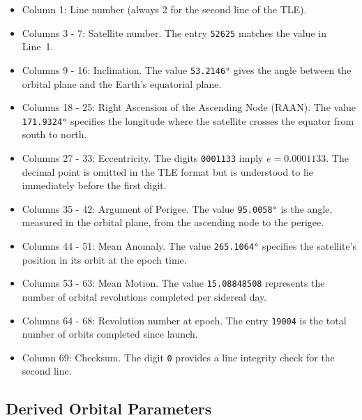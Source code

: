 \documentclass{article}
\begin{document}
\begin{itemize}
    \item Column 1: Line number (always 2 for the second line of the TLE).
    \item Columns 3 - 7: Satellite number. The entry \texttt{52625} matches the value in Line~1.
    \item Columns 9 - 16: Inclination. The value \texttt{53.2146\si{\degree}} gives the angle between the orbital plane and the Earth's equatorial plane.
    \item Columns 18 - 25: Right Ascension of the Ascending Node (RAAN). The value \texttt{171.9324\si{\degree}} specifies the longitude where the satellite crosses the equator from south to north.
    \item Columns 27 - 33: Eccentricity. The digits \texttt{0001133} imply \(e = 0.0001133\). The decimal point is omitted in the TLE format but is understood to lie immediately before the first digit.
    \item Columns 35 - 42: Argument of Perigee. The value \texttt{95.0058\si{\degree}} is the angle, measured in the orbital plane, from the ascending node to the perigee.
    \item Columns 44 - 51: Mean Anomaly. The value \texttt{265.1064\si{\degree}} specifies the satellite’s position in its orbit at the epoch time.
    \item Columns 53 - 63: Mean Motion. The value \texttt{15.08848508} represents the number of orbital revolutions completed per sidereal day.
    \item Columns 64 - 68: Revolution number at epoch. The entry \texttt{19004} is the total number of orbits completed since launch.
    \item Column 69: Checksum. The digit \texttt{0} provides a line integrity check for the second line.
\end{itemize}

\subsection*{Derived Orbital Parameters}
\end{document}
